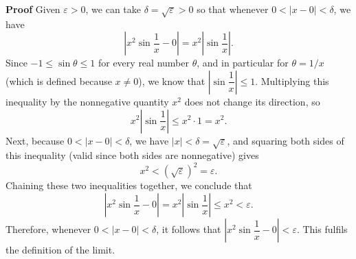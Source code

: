 \documentclass{article}
\begin{document}
\textbf{Proof}
Given $\varepsilon > 0$, we can take $\delta = \sqrt{\varepsilon} > 0$ so that whenever $0 < |x - 0| < \delta$, we have
\[
\left|x^2 \sin\frac{1}{x} - 0\right| = x^2\left|\sin\frac{1}{x}\right|.
\]
Since $-1 \leq \sin\theta \leq 1$ for every real number $\theta$, and in particular for $\theta = 1/x$ (which is defined because $x \neq 0$), we know that $\left|\sin\dfrac{1}{x}\right| \leq 1$. Multiplying this inequality by the nonnegative quantity $x^2$ does not change its direction, so
\[
x^2\left|\sin\frac{1}{x}\right| \leq x^2 \cdot 1 = x^2.
\]
Next, because $0 < |x - 0| < \delta$, we have $|x| < \delta = \sqrt{\varepsilon}$, and squaring both sides of this inequality (valid since both sides are nonnegative) gives
\[
x^2 < \left(\sqrt{\varepsilon}\right)^2 = \varepsilon.
\]
Chaining these two inequalities together, we conclude that
\[
\left|x^2 \sin\frac{1}{x} - 0\right| = x^2\left|\sin\frac{1}{x}\right| \leq x^2 < \varepsilon.
\]
Therefore, whenever $0 < |x - 0| < \delta$, it follows that $\left|x^2\sin\dfrac{1}{x} - 0\right| < \varepsilon$. This fulfils the definition of the limit. 
\end{document}
